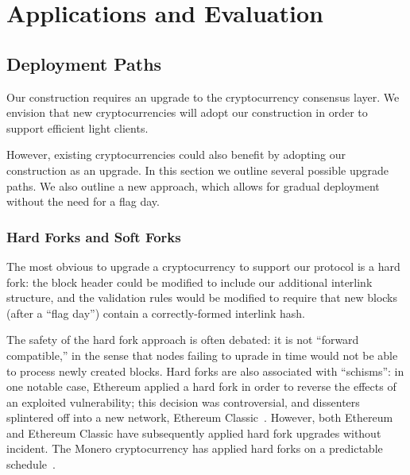 \section{Applications and Evaluation}

\subsection{Deployment Paths}
Our construction requires an upgrade to the cryptocurrency consensus layer.
We envision that new cryptocurrencies will adopt our construction in order to support efficient light clients.

However, existing cryptocurrencies could also benefit by adopting our construction as an upgrade.
In this section we outline several possible upgrade paths. We also outline a new approach, which allows for gradual deployment without the need for a flag day.

\subsubsection{Hard Forks and Soft Forks}
The most obvious to upgrade a cryptocurrency to support our protocol is a hard fork: the block header could be modified to include our additional interlink structure, and the validation rules would be modified to require that new blocks (after a ``flag day'') contain a correctly-formed interlink hash.

The safety of the hard fork approach is often debated: it is not ``forward compatible,'' in the sense that nodes failing to uprade in time would not be able to process newly created blocks. Hard forks are also associated with ``schisms'': in one notable case, Ethereum applied a hard fork in order to reverse the effects of an exploited vulnerability; this decision was controversial, and dissenters splintered off into a new network, Ethereum Classic~\cite{daofork}. However, both Ethereum and Ethereum Classic have subsequently applied hard fork upgrades without incident. The Monero cryptocurrency has applied hard forks on a predictable schedule~\cite{monerohardforks}.

